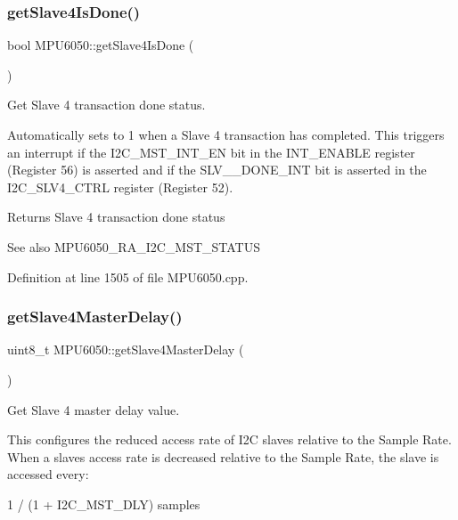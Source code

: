 \subsubsection{\texorpdfstring{getSlave4IsDone()}{getSlave4IsDone()}}
{\footnotesize\ttfamily bool M\+P\+U6050\+::get\+Slave4\+Is\+Done (\begin{DoxyParamCaption}{ }\end{DoxyParamCaption})}



Get Slave 4 transaction done status. 

Automatically sets to 1 when a Slave 4 transaction has completed. This triggers an interrupt if the I2\+C\+\_\+\+M\+S\+T\+\_\+\+I\+N\+T\+\_\+\+EN bit in the I\+N\+T\+\_\+\+E\+N\+A\+B\+LE register (Register 56) is asserted and if the S\+L\+V\+\_\+\_\+\+D\+O\+N\+E\+\_\+\+I\+NT bit is asserted in the I2\+C\+\_\+\+S\+L\+V4\+\_\+\+C\+T\+RL register (Register 52). \begin{DoxyReturn}{Returns}
Slave 4 transaction done status 
\end{DoxyReturn}
\begin{DoxySeeAlso}{See also}
M\+P\+U6050\+\_\+\+R\+A\+\_\+\+I2\+C\+\_\+\+M\+S\+T\+\_\+\+S\+T\+A\+T\+US 
\end{DoxySeeAlso}


Definition at line 1505 of file M\+P\+U6050.\+cpp.

\mbox{\label{classMPU6050_a9a4585b3c9e61478db198011107a56a9}} 
\subsubsection{\texorpdfstring{getSlave4MasterDelay()}{getSlave4MasterDelay()}}
{\footnotesize\ttfamily uint8\+\_\+t M\+P\+U6050\+::get\+Slave4\+Master\+Delay (\begin{DoxyParamCaption}{ }\end{DoxyParamCaption})}



Get Slave 4 master delay value. 

This configures the reduced access rate of I2C slaves relative to the Sample Rate. When a slave\textquotesingle{}s access rate is decreased relative to the Sample Rate, the slave is accessed every\+: \begin{DoxyVerb}1 / (1 + I2C_MST_DLY) samples
\end{DoxyVerb}


